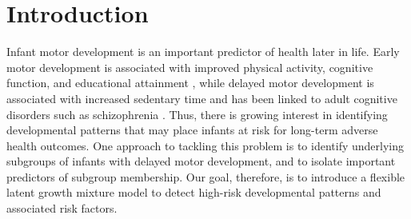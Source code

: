 \documentclass[useAMS,usenatbib,referee]{biom}
\begin{document}
\setcounter{tocdepth}{3}

\newpage


%

\section{Introduction}
\label{s:intro}
Infant motor development is an important predictor of health later in life. Early motor development is associated with improved physical activity, cognitive function, and educational attainment \citep{aaltonen2015motor,taanila2005infant}, while delayed motor development is associated with increased sedentary time \citep{sanchez2017prospective} and has been linked to adult cognitive disorders such as schizophrenia \citep{filatova2017early}. Thus, there is growing interest in identifying developmental patterns that may place infants at risk for long-term adverse health outcomes. One approach to tackling this problem is to identify underlying subgroups of infants with delayed motor development, and to isolate important predictors of subgroup membership. Our goal, therefore, is to introduce a flexible latent growth mixture model to detect high-risk developmental patterns and associated risk factors.
\end{document}
